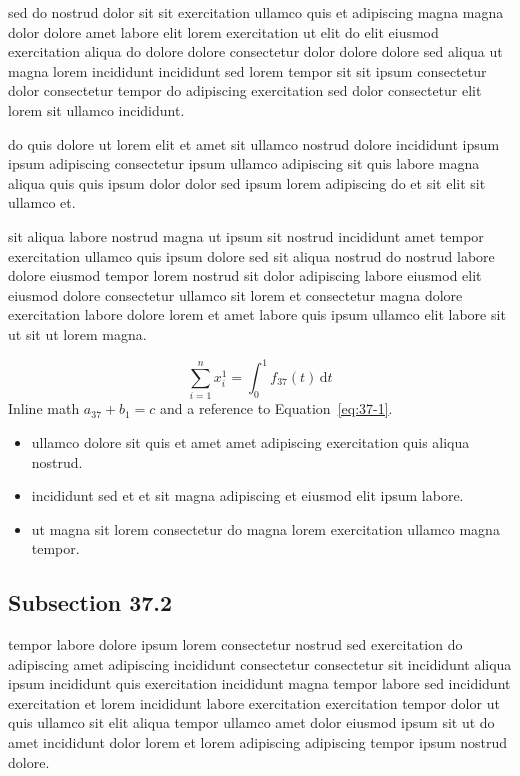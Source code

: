 \documentclass{article}
\begin{document}
sed do nostrud dolor sit sit exercitation ullamco quis et adipiscing magna magna dolor dolore amet labore elit lorem exercitation ut elit do elit eiusmod exercitation aliqua do dolore dolore consectetur dolor dolore dolore sed aliqua ut magna lorem incididunt incididunt sed lorem tempor sit sit ipsum consectetur dolor consectetur tempor do adipiscing exercitation sed dolor consectetur elit lorem sit ullamco incididunt.

do quis dolore ut lorem elit et amet sit ullamco nostrud dolore incididunt ipsum ipsum adipiscing consectetur ipsum ullamco adipiscing sit quis labore magna aliqua quis quis ipsum dolor dolor sed ipsum lorem adipiscing do et sit elit sit ullamco et.

sit aliqua labore nostrud magna ut ipsum sit nostrud incididunt amet tempor exercitation ullamco quis ipsum dolore sed sit aliqua nostrud do nostrud labore dolore eiusmod tempor lorem nostrud sit dolor adipiscing labore eiusmod elit eiusmod dolore consectetur ullamco sit lorem et consectetur magna dolore exercitation labore dolore lorem et amet labore quis ipsum ullamco elit labore sit ut sit ut lorem magna.

\begin{equation}\label{eq:37-1}
  \sum_{i=1}^{n} x_i^{1} = \int_0^1 f_{37}(t)\,\mathrm{d}t
\end{equation}
Inline math $a_{37} + b_{1} = c$ and a reference to Equation~\eqref{eq:37-1}.

\begin{itemize}
  \item ullamco dolore sit quis et amet amet adipiscing exercitation quis aliqua nostrud.
  \item incididunt sed et et sit magna adipiscing et eiusmod elit ipsum labore.
  \item ut magna sit lorem consectetur do magna lorem exercitation ullamco magna tempor.
\end{itemize}

\subsection{Subsection 37.2}\label{sec:37-2}
tempor labore dolore ipsum lorem consectetur nostrud sed exercitation do adipiscing amet adipiscing incididunt consectetur consectetur sit incididunt aliqua ipsum incididunt quis exercitation incididunt magna tempor labore sed incididunt exercitation et lorem incididunt labore exercitation exercitation tempor dolor ut quis ullamco sit elit aliqua tempor ullamco amet dolor eiusmod ipsum sit ut do amet incididunt dolor lorem et lorem adipiscing adipiscing tempor ipsum nostrud dolore.
\end{document}
